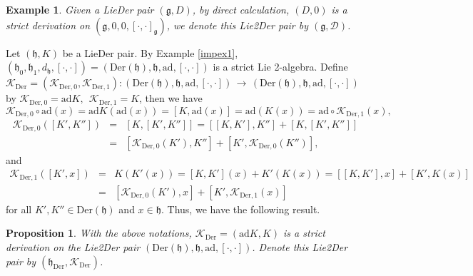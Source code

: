 \documentclass[12pt]{amsart}
\newtheorem{pro}[thm]{Proposition}
\newtheorem{ex}[thm]{Example}
\newcommand{\lon }{\,\rightarrow\,}
\newcommand{\g}{\mathfrak g}
\newcommand{\h}{\mathfrak h}
\newcommand{\huaD}{\mathcal{D}}
\newcommand{\huaK}{\mathcal{K}}
\newcommand{\LD}{{\rm LieDer }}
\newcommand{\LtoD}{{\rm Lie2Der }}
\newcommand{\Der}{\mathrm{Der}}
\newcommand{\ad}{\mathrm{ad}}
\begin{document}
\begin{ex}
Given a \LD pair $(\g,D)$, by direct calculation, $(D, 0)$ is a strict derivation on $(\g,0,0,[\cdot,\cdot]_{\g})$, we denote this \LtoD pair by $(\g,\huaD)$.
\end{ex}
Let $(\h, K)$ be a \LD pair. By Example \ref{impex1}, $(\h_0, \h_1, d_\h, [\cdot, \cdot])=(\Der(\h),\h,\ad,[\cdot,\cdot])$ is a strict Lie 2-algebra. Define $\huaK_{\Der}=(\huaK_{\Der, 0}, \huaK_{\Der, 1}): (\Der(\h),\h,\ad,[\cdot,\cdot])\lon (\Der(\h),\h,\ad,[\cdot,\cdot])$ by $\huaK_{\Der, 0}=\ad K,~~\huaK_{\Der, 1}=K$, then we have 
\begin{equation*}
\huaK_{\Der,0}\circ \ad(x)=\ad K(\ad (x))=[K,\ad(x)]=\ad(K(x))=\ad \circ \huaK_{\Der,1}(x),
\end{equation*}
\begin{eqnarray*}
\huaK_{\Der,0}([K',K''])&=&[K,[K',K'']]=[[K,K'],K'']+[K,[K',K'']]\\
&=&[\huaK_{\Der,0}(K'),K'']+[K',\huaK_{\Der,0}(K'')],
\end{eqnarray*}
and
\begin{eqnarray*}
\huaK_{\Der,1}([K',x])&=&K(K'(x))
=[K,K'](x)+K'(K(x))=[[K,K'],x]+[K',K(x)]\\
&=&[\huaK_{\Der,0}(K'),x]+[K',\huaK_{\Der,1}(x)]
\end{eqnarray*}
for all $K',K''\in \Der(\h)$ and $x\in \h$.
Thus, we have the following result.
\begin{pro}
With the above notations, $\huaK_{\Der}=(\ad K,K)$ is a strict derivation on the \LtoD pair
$(\Der(\h),\h,\ad,[\cdot,\cdot])$. Denote this \LtoD pair by $(\h_{\Der},\huaK_{\Der})$.
\end{pro}
\end{document}

